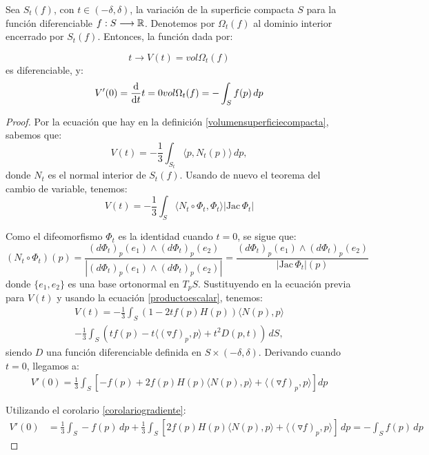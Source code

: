 \begin{proposition}
Sea $S_t(f)$, con $t \in (-\delta, \delta)$, la variación de la superficie compacta $S$ para la función diferenciable $f: S \longrightarrow \mathbb{R}$. Denotemos por $\Omega_t(f)$ al dominio interior encerrado por $S_t(f)$. Entonces, la función dada por:

\begin{equation*}
    t \longrightarrow V(t) = vol \Omega_t (f)
\end{equation*}
%
es diferenciable, y:
%
\begin{equation}\label{variacionvolumen}
    V'(0) = \diff{}{t}{t=0} vol \Omega_t (f) = - \int_S f(p) \, dp
\end{equation}
\end{proposition}
\begin{proof}
Por la ecuación que hay en la definición \ref{volumensuperficiecompacta}, sabemos que:
%
\begin{equation*}
    V(t) = - \frac{1}{3} \int_{S_t}  \langle p, N_t(p) \rangle \, dp,
\end{equation*}
%
donde $N_t$ es el normal interior de $S_t(f)$. Usando de nuevo el teorema del cambio de variable, tenemos:
%
\begin{equation*}
    V(t) = - \frac{1}{3} \int_{S}  \langle N_t \circ \Phi_t, \Phi_t \rangle |\text{Jac} \, \Phi_t|
\end{equation*}

Como el difeomorfismo $\Phi_t$ es la identidad cuando $t=0$, se sigue que:
%
\begin{equation*}
    (N_t \circ \Phi_t)(p) = \frac{(d\Phi_t)_p(e_1) \wedge (d\Phi_t)_p(e_2)}{|(d\Phi_t)_p(e_1) \wedge (d\Phi_t)_p(e_2)|} = \frac{(d\Phi_t)_p(e_1) \wedge (d\Phi_t)_p(e_2)}{|\text{Jac} \, \Phi_t|(p)}
\end{equation*}
%
donde $\{e_1,e_2\}$ es una base ortonormal en $T_pS$. Sustituyendo en la ecuación previa para $V(t)$ y usando la ecuación \ref{productoescalar}, tenemos:
%
\begin{align*}
    V(t) = - \frac{1}{3} \int_S \left( 1-2tf(p)H(p) \right) \langle N(p), p \rangle  \\ - \frac{1}{3} \int_S \left( tf(p) - t \langle (\triangledown f)_p, p \rangle  + t^2D(p,t) \right) \, dS,
\end{align*}
%
siendo $D$ una función diferenciable definida en $S \times (-\delta, \delta)$. Derivando cuando $t=0$, llegamos a:
%
\begin{align*}
    V'(0) = \frac{1}{3} \int_S [-f(p) + 2f(p)H(p) \langle N(p),p \rangle  +  \langle (\triangledown f)_p, p \rangle ] dp
\end{align*}

Utilizando el corolario \ref{corolariogradiente}:
%
\begin{align*}
    V'(0) &= \frac{1}{3} \int_S -f(p) \, dp + \frac{1}{3} \int_S [2f(p)H(p) \langle N(p),p \rangle  +  \langle (\triangledown f)_p, p \rangle ] \, dp  = - \int_S f(p) \, dp
\end{align*}
\end{proof}

